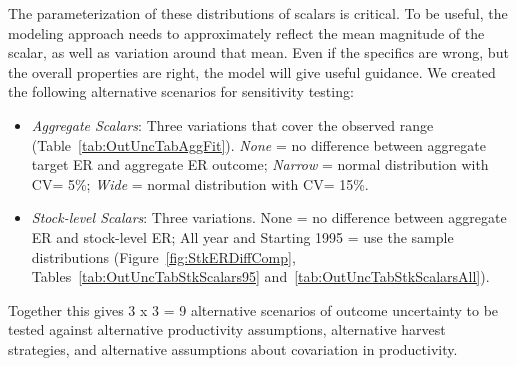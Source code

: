 \documentclass[french,11pt]{book}
\begin{document}
The parameterization of these distributions of scalars is critical. To be useful, the modeling approach needs to approximately reflect the mean magnitude of the scalar, as well as variation around that mean. Even if the specifics are wrong, but the overall properties are right, the model will give useful guidance. We created the following alternative scenarios for sensitivity testing:
\begin{itemize}

\item
  \emph{Aggregate Scalars}: Three variations that cover the observed range (Table~\ref{tab:OutUncTabAggFit}). \emph{None} = no difference between aggregate target ER and aggregate ER outcome; \emph{Narrow} = normal distribution with CV= 5\%; \emph{Wide} = normal distribution with CV= 15\%.
\item
  \emph{Stock-level Scalars}: Three variations. None = no difference between aggregate ER and stock-level ER; All year and Starting 1995 = use the sample distributions (Figure~\ref{fig:StkERDiffComp}, Tables~\ref{tab:OutUncTabStkScalars95} and~\ref{tab:OutUncTabStkScalarsAll}).
\end{itemize}
Together this gives 3 x 3 = 9 alternative scenarios of outcome uncertainty to be tested against alternative productivity assumptions, alternative harvest strategies, and alternative assumptions about covariation in productivity.
\end{document}
